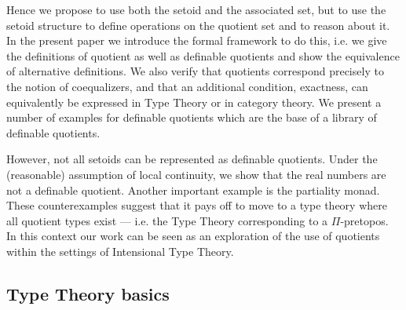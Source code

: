 \documentclass[envcountsame]{llncs}
\begin{document}
Hence we propose to use both the setoid
and the associated set, but to use the setoid structure to define
operations on the quotient set and to reason about it. In the present
paper we introduce the formal framework to do this, i.e. we give the definitions of  quotient as well as definable quotients and show the
equivalence of alternative definitions. We also verify that quotients
correspond precisely to the notion of coequalizers, and that an
additional condition, exactness, can equivalently be expressed in Type
Theory or in category theory. We present a number of examples for
definable quotients which are the base of a library of definable
quotients. 

However, not all setoids can be represented as definable
quotients. Under the (reasonable) assumption of local continuity, we
show that the real numbers are not a definable quotient. Another
important example is the partiality monad. These counterexamples
suggest that it pays off to move to a type theory where all
quotient types exist --- i.e. the Type Theory corresponding to a
$\Pi$-pretopos. In this context our work can be seen as an exploration
of the use of quotients within the settings of Intensional Type
Theory.

\subsection{Type Theory basics}
\label{sec:type-theory-basics}
\end{document}
